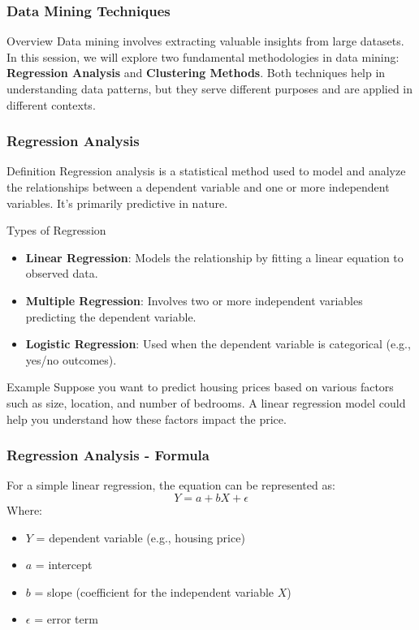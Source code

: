 \documentclass[aspectratio=169]{beamer}
\begin{document}
\begin{frame}[fragile]
    \frametitle{Data Mining Techniques}
    \begin{block}{Overview}
        Data mining involves extracting valuable insights from large datasets. In this session, we will explore two fundamental methodologies in data mining: \textbf{Regression Analysis} and \textbf{Clustering Methods}. Both techniques help in understanding data patterns, but they serve different purposes and are applied in different contexts.
    \end{block}
\end{frame}

\begin{frame}[fragile]
    \frametitle{Regression Analysis}
    \begin{block}{Definition}
        Regression analysis is a statistical method used to model and analyze the relationships between a dependent variable and one or more independent variables. It's primarily predictive in nature.
    \end{block}
    
    \begin{block}{Types of Regression}
        \begin{itemize}
            \item \textbf{Linear Regression}: Models the relationship by fitting a linear equation to observed data.
            \item \textbf{Multiple Regression}: Involves two or more independent variables predicting the dependent variable.
            \item \textbf{Logistic Regression}: Used when the dependent variable is categorical (e.g., yes/no outcomes).
        \end{itemize}
    \end{block}
    
    \begin{block}{Example}
        Suppose you want to predict housing prices based on various factors such as size, location, and number of bedrooms. A linear regression model could help you understand how these factors impact the price.
    \end{block}
\end{frame}

\begin{frame}[fragile]
    \frametitle{Regression Analysis - Formula}
    For a simple linear regression, the equation can be represented as:
    \begin{equation}
        Y = a + bX + \epsilon
    \end{equation}
    Where:
    \begin{itemize}
        \item $Y$ = dependent variable (e.g., housing price)
        \item $a$ = intercept
        \item $b$ = slope (coefficient for the independent variable $X$)
        \item $\epsilon$ = error term
    \end{itemize}
\end{frame}
\end{document}
